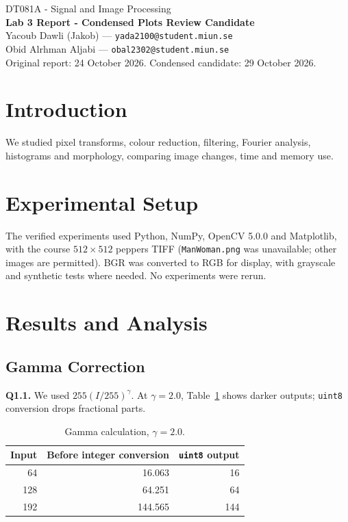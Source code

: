 \documentclass[10pt,a4paper]{article}
\begin{document}
\begin{center}
{\large DT081A - Signal and Image Processing}\\[2pt]
{\large\bfseries Lab 3 Report - Condensed Plots Review Candidate}\\[3pt]
Yacoub Dawli (Jakob) --- \texttt{yada2100@student.miun.se}\\
Obid Alrhman Aljabi --- \texttt{obal2302@student.miun.se}\\[2pt]
{\small Original report: 24 October 2026. Condensed candidate: 29 October 2026.}
\end{center}
\vspace{-5pt}

\section{Introduction}
We studied pixel transforms, colour reduction, filtering, Fourier analysis,
histograms and morphology, comparing image changes, time and memory use.

\section{Experimental Setup}
The verified experiments used Python, NumPy, OpenCV 5.0.0 and Matplotlib,
with the course \(512\times512\) peppers TIFF (\texttt{ManWoman.png} was unavailable;
other images are permitted). BGR was converted to RGB for display, with grayscale
and synthetic tests where needed. No experiments were rerun.

\section{Results and Analysis}
\subsection{Gamma Correction}
\textbf{Q1.1.} We used \(255(I/255)^\gamma\). At \(\gamma=2.0\),
Table~\ref{tab:gamma} shows darker outputs; \texttt{uint8} conversion drops
fractional parts.

\begin{table}[H]
\centering
\caption{Gamma calculation, \(\gamma=2.0\).}\label{tab:gamma}
\begin{tabular}{rrr}\toprule
Input & Before integer conversion & \texttt{uint8} output\\\midrule
64 & 16.063 & 16\\
128 & 64.251 & 64\\
192 & 144.565 & 144\\\bottomrule
\end{tabular}
\end{table}
\end{document}

